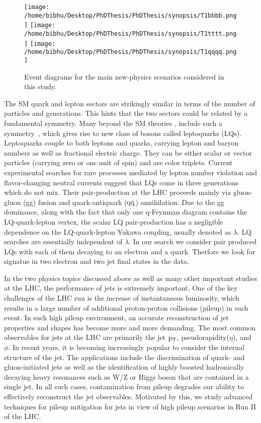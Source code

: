 \begin{figure}[h]
\centering
\texttt{[image: /home/bibhu/Desktop/PhDThesis/PhDThesis/synopsis/T1bbbb.png]}
\texttt{[image: /home/bibhu/Desktop/PhDThesis/PhDThesis/synopsis/T1tttt.png]}
\texttt{[image: /home/bibhu/Desktop/PhDThesis/PhDThesis/synopsis/T1qqqq.png]}

\caption{\label{fig:frog}Event diagrams for the main new-physics scenarios considered in this study.}
\end{figure}

The SM quark and lepton sectors are strikingly similar in terms of the number of particles and generations. This hints that the two sectors could be
related by a fundamental symmetry. Many beyond the SM theories , include
such a symmetry~\cite{LQ1,LQ2,LQ3,LQ4}, which gives rise to new class of bosons called leptoquarks (LQs). Leptoquarks couple
to both leptons and quarks, carrying lepton and baryon numbers as well as fractional electric charge.
They can be either scalar or vector particles (carrying zero or one unit of spin) and are color
triplets. Current experimental searches for rare processes mediated by lepton number violation and
flavor-changing neutral currents suggest that LQs come in three generations which do
not mix. Their pair-production at the LHC proceeds mainly via gluon-gluon (gg) fusion  and
quark-antiquark ($\rm q\bar{q}$) annihilation. Due  to  the gg dominance,  along  with  the  fact  that  only  one q-Feynman  diagram
contains the LQ-quark-lepton vertex, the scalar LQ pair-production has a negligible dependence on the
 LQ-quark-lepton Yukawa coupling, usually denoted as $\lambda$. LQ searches are essentially independent of $\lambda$. 
In our search we consider pair produced LQs with each of them decaying to an electron and a quark. Therfore we look for signatue in two electron and two jet final states in the data.

In the two physics topics discussed above as well as many other important studies at the LHC, the performance of jets is extremely important.
 One of the key challenges of the  LHC run is the increase of instantaneous luminosity, which results in a large number of additional proton-proton collisions (pileup) in each event. In such high pileup environment, an accurate reconstruction of jet properties and shapes has become more and more demanding. The most common observables for jets at the LHC  are primarily the jet $\rm p_{T}$, pseudorapidity($\eta$), and $\phi$.
In recent years, it is becoming increasingly popular to consider the internal structure of the jet. The applications include the discrimination of quark- and gluon-initiated jets as well as the identification of highly boosted hadronically decaying heavy resonances such as W/Z or Higgs boson that are contained in a single jet.  
In all such cases, contamination from pileup degrades our ability to effectively reconstruct the jet observables.  
Motivated by this, we study advanced techniques for pileup mitigation for jets in view of high pileup scenarios in Run II of the LHC.





